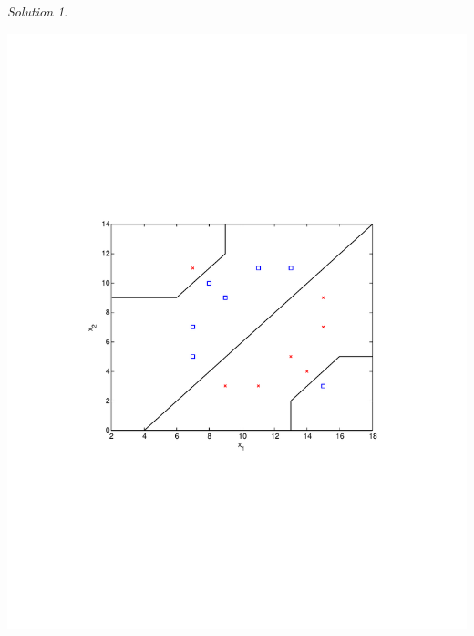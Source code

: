 \documentclass[a4paper,twoside=false,abstract=false,numbers=noenddot,
titlepage=false,headings=small,parskip=half,version=last]{scrartcl}
\theoremstyle{definition}
\theoremstyle{remark}
\newtheorem*{solution}{Solution}
\begin{document}
\begin{solution}
    \begin{center}
        \includegraphics{exercise2.pdf}
    \end{center}
\end{solution}
\end{document}

